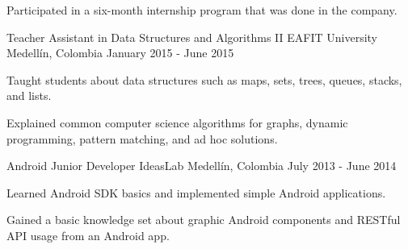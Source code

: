 \begin{cventries}
{\begin{cvitems}
        \item {Participated in a six-month internship program that was done in the company.}
      \end{cvitems}
    }
  \cventry
    {Teacher Assistant in Data Structures and Algorithms II}
    {EAFIT University}
    {Medellín, Colombia}
    {January 2015 - June 2015}
    {
      \begin{cvitems}
        \item {Taught students about data structures such as maps, sets, trees, queues, stacks, and lists.}
        \item {Explained common computer science algorithms for graphs, dynamic programming, pattern matching, and ad hoc solutions.}
      \end{cvitems}
    }
  \cventry
    {Android Junior Developer}
    {IdeasLab}
    {Medellín, Colombia}
    {July 2013 - June 2014}
    {
      \begin{cvitems}
        \item {Learned Android SDK basics and implemented simple Android applications.}
        \item {Gained a basic knowledge set about graphic Android components and RESTful API usage from an Android app.}
      \end{cvitems}
    }
\end{cventries}
